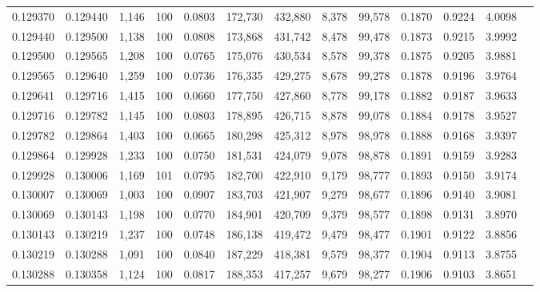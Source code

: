 \begin{tabular}{rrrrrrrrrrrrr}
0.129370 & 0.129440 & 1,146 & 100 &                                     0.0803 & 172,730 & 432,880 &   8,378 &  99,578 & 0.1870 & 0.9224 & 4.0098 \\
0.129440 & 0.129500 & 1,138 & 100 &                                     0.0808 & 173,868 & 431,742 &   8,478 &  99,478 & 0.1873 & 0.9215 & 3.9992 \\
0.129500 & 0.129565 & 1,208 & 100 &                                     0.0765 & 175,076 & 430,534 &   8,578 &  99,378 & 0.1875 & 0.9205 & 3.9881 \\
0.129565 & 0.129640 & 1,259 & 100 &                                     0.0736 & 176,335 & 429,275 &   8,678 &  99,278 & 0.1878 & 0.9196 & 3.9764 \\
0.129641 & 0.129716 & 1,415 & 100 &                                     0.0660 & 177,750 & 427,860 &   8,778 &  99,178 & 0.1882 & 0.9187 & 3.9633 \\
0.129716 & 0.129782 & 1,145 & 100 &                                     0.0803 & 178,895 & 426,715 &   8,878 &  99,078 & 0.1884 & 0.9178 & 3.9527 \\
0.129782 & 0.129864 & 1,403 & 100 &                                     0.0665 & 180,298 & 425,312 &   8,978 &  98,978 & 0.1888 & 0.9168 & 3.9397 \\
0.129864 & 0.129928 & 1,233 & 100 &                                     0.0750 & 181,531 & 424,079 &   9,078 &  98,878 & 0.1891 & 0.9159 & 3.9283 \\
0.129928 & 0.130006 & 1,169 & 101 &                                     0.0795 & 182,700 & 422,910 &   9,179 &  98,777 & 0.1893 & 0.9150 & 3.9174 \\
0.130007 & 0.130069 & 1,003 & 100 &                                     0.0907 & 183,703 & 421,907 &   9,279 &  98,677 & 0.1896 & 0.9140 & 3.9081 \\
0.130069 & 0.130143 & 1,198 & 100 &                                     0.0770 & 184,901 & 420,709 &   9,379 &  98,577 & 0.1898 & 0.9131 & 3.8970 \\
0.130143 & 0.130219 & 1,237 & 100 &                                     0.0748 & 186,138 & 419,472 &   9,479 &  98,477 & 0.1901 & 0.9122 & 3.8856 \\
0.130219 & 0.130288 & 1,091 & 100 &                                     0.0840 & 187,229 & 418,381 &   9,579 &  98,377 & 0.1904 & 0.9113 & 3.8755 \\
0.130288 & 0.130358 & 1,124 & 100 &                                     0.0817 & 188,353 & 417,257 &   9,679 &  98,277 & 0.1906 & 0.9103 & 3.8651 \\

\end{tabular}
